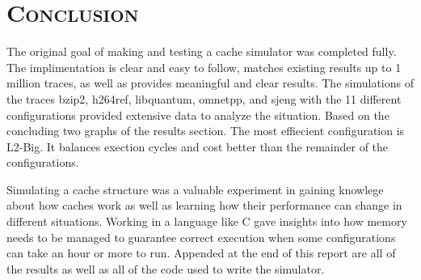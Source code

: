 \documentclass[cacheSimReport.tex]{subfiles}
\begin{document}
\section*{\textsc{\Large Conclusion}}

The original goal of making and testing a cache simulator was completed fully. The implimentation is clear and easy to follow, matches existing results up to 1 million traces, as well as provides meaningful and clear results. The simulations of the traces bzip2, h264ref, libquantum, omnetpp, and sjeng with the 11 different configurations provided extensive data to analyze the situation. Based on the concluding two graphs of the results section. The most effiecient configuration is L2-Big. It balances exection cycles and cost better than the remainder of the configurations.

Simulating a cache structure was a valuable experiment in gaining knowlege about how caches work as well as learning how their performance can change in different situations. Working in a language like C gave insights into how memory needs to be managed to guarantee correct execution when some configurations can take an hour or more to run. Appended at the end of this report are all of the results as well as all of the code used to write the simulator.
\end{document}
